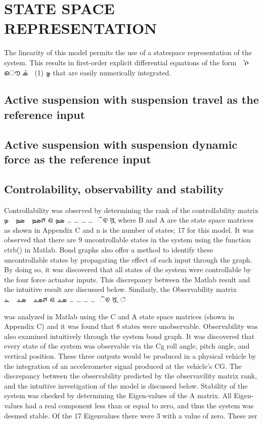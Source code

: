 \documentclass[10pt,twocolumn]{witseiepaper}
\begin{document}
\section{STATE SPACE REPRESENTATION}

The linearity of this model permits the use of a statespace representation of the system. This results in 
first-order explicit differential equations of the form 
 ܺ
ሶ ൌ ܣܺ ൅ ܤܷ (1) 
 that are easily numerically integrated. 
\subsection{Active suspension with suspension travel as the reference input}

\subsection{Active suspension with suspension dynamic force as the reference input}


\subsection{Controlability, observability and stability} 


Controllability was observed by determining the rank 
of the controllability matrix 
ܣܤ  ܣܤ  ܤሾ
ଶ
ܣܤ … … … …
௡ିଵ
ሿ 
where B and A are the state space matrices as shown 
in Appendix C and n is the number of states; 17 for 
this model. It was observed that there are 9 
uncontrollable states in the system using the function 
ctrb() in Matlab. Bond graphs also offer a method to 
identify these uncontrollable states by propagating 
the effect of each input through the graph. By doing 
so, it was discovered that all states of the system were 
controllable by the four force actuator inputs. This 
discrepancy between the Matlab result and the 
intuitive result are discussed below. 
Similarly, the Observability matrix 
ܣܥ  ܣܥ  ܥሾ
ଶ
ܣܥ … … … …
௡ିଵ
ሿ
்
 
was analyzed in Matlab using the C and A state space 
matrices (shown in Appendix C) and it was found 
that 8 states were unobservable. Observability was 
also examined intuitively through the system bond 
graph. It was discovered that every state of the 
system was observable via the Cg roll angle, pitch 
angle, and vertical position. These three outputs 
would be produced in a physical vehicle by the 
integration of an accelerometer signal produced at the 
vehicle’s CG. The discrepancy between the 
observability predicted by the observavility matrix 
rank, and the intuitive investigation of the model is 
discussed below. 
Stability of the system was checked by determining 
the Eigen-values of the A matrix. All Eigen-values 
had a real component less than or equal to zero, and 
thus the system was deemed stable. Of the 17 Eigenvalues there were 3 with a value of zero. These zer
\end{document}
